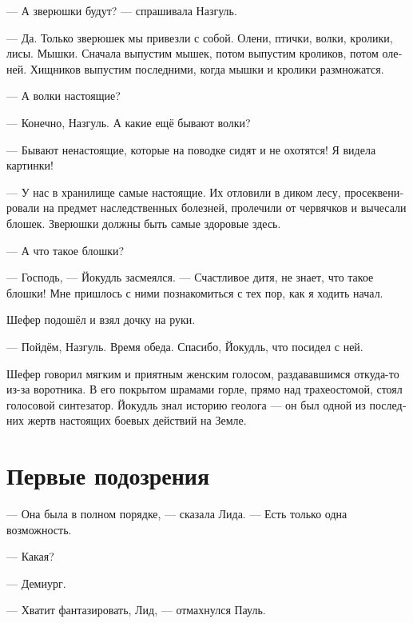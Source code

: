 \documentclass[a4paper,12pt,fleqn]{book}\usepackage{polyglossia}\setdefaultlanguage[babelshorthands=true]{russian}\setotherlanguage{english}\defaultfontfeatures{Ligatures=TeX,Mapping=tex-text}\usepackage{xcolor}\newcommand{\ml}[3]{#2}
\begin{document}
--- А зверюшки будут? --- спрашивала Назгуль.

--- Да.
Только зверюшек мы привезли с собой.
\ml{$0$}
{Олени, птички, волки, кролики, лисы.}
{Deers, birds, wolves, bunnies, foxes.}
\ml{$0$}
{Мышки.}
{Mice.}
Сначала выпустим мышек, потом выпустим кроликов, потом оленей.
Хищников выпустим последними, когда мышки и кролики размножатся.

\ml{$0$}
{--- А волки настоящие?}
{``Are wolves real?''}

\ml{$0$}
{--- Конечно, Назгуль.}
{``Of course, Nasgul.}
\ml{$0$}
{А какие ещё бывают волки?}
{What other kind of wolves are there?''}

\ml{$0$}
{--- Бывают ненастоящие, которые на поводке сидят и не охотятся!}
{``\emph{Not real} wolves, they are on a leash and never hunt!}
Я видела картинки!

--- У нас в хранилище самые настоящие.
Их отловили в диком лесу, просеквенировали на предмет наследственных болезней, пролечили от червячков и вычесали блошек.
Зверюшки должны быть самые здоровые здесь.

--- А что такое блошки?

\ml{$0$}
{--- Господь, --- Йокудль засмеялся.}
{``Herrgott,'' Jökull laughed.}
\ml{$0$}
{--- Счастливое дитя, не знает, что такое блошки!}
{``What a happy child, she has never heard of a fleas!}
Мне пришлось с ними познакомиться с тех пор, как я ходить начал.

Шефер подошёл и взял дочку на руки.

\ml{$0$}
{--- Пойдём, Назгуль.}
{``Come, Nasgul.}
\ml{$0$}
{Время обеда.}
{Dinner time.}
Спасибо, Йокудль, что посидел с ней.

Шефер говорил мягким и приятным женским голосом, раздававшимся откуда-то из-за воротника.
В его покрытом шрамами горле, прямо над трахеостомой, стоял голосовой синтезатор.
Йокудль знал историю геолога --- он был одной из последних жертв настоящих боевых действий на Земле.

\section{Первые подозрения}

--- Она была в полном порядке, --- сказала Лида.
--- Есть только одна возможность.

--- Какая?

--- Демиург.

--- Хватит фантазировать, Лид, --- отмахнулся Пауль.
\end{document}
